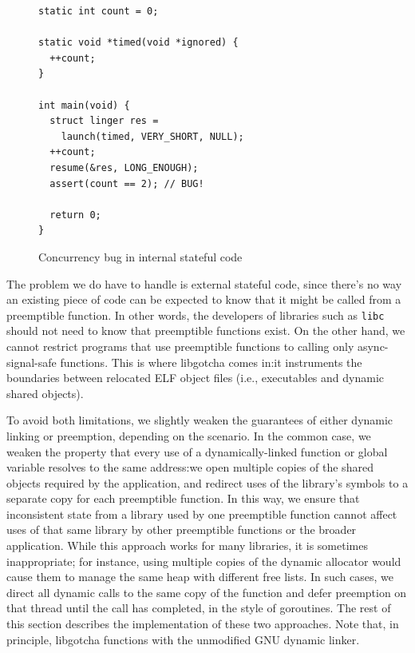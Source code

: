 \begin{figure}
\begin{verbatim}
static int count = 0;

static void *timed(void *ignored) {
  ++count;
}

int main(void) {
  struct linger res =
    launch(timed, VERY_SHORT, NULL);
  ++count;
  resume(&res, LONG_ENOUGH);
  assert(count == 2); // BUG!

  return 0;
}
\end{verbatim}
\caption{Concurrency bug in internal stateful code}
\label{fig:ingerbug}
\end{figure}

The problem we do have to handle is external stateful code, since there's no way an
existing piece of code can be expected to know that it might be called from a
preemptible function.  In other words, the developers of libraries such as
\texttt{libc} should not need to know that preemptible functions exist.  On the other
hand, we cannot restrict programs that use preemptible functions to calling only
async-signal-safe functions.  This is where libgotcha comes in:\@ it instruments the
boundaries between relocated ELF object files (i.e., executables and dynamic shared
objects).

To avoid both limitations, we slightly weaken the guarantees of either dynamic
linking or preemption, depending on the scenario.  In the common case, we weaken the
property that every use of a dynamically-linked function or global variable resolves
to the same address:\@ we open multiple copies of the shared objects required by the
application, and redirect uses of the library's symbols to a separate copy for each
preemptible function.  In this way, we ensure that inconsistent state from a library
used by one preemptible function cannot affect uses of that same library by other
preemptible functions or the broader application.  While this approach works for many
libraries, it is sometimes inappropriate; for instance, using multiple copies of the
dynamic allocator would cause them to manage the same heap with different free lists.
In such cases, we direct all dynamic calls to the same copy of the function and defer
preemption on that thread until the call has completed, in the style of goroutines.
The rest of this section describes the implementation of these two approaches.  Note
that, in principle, libgotcha functions with the unmodified GNU dynamic linker.


